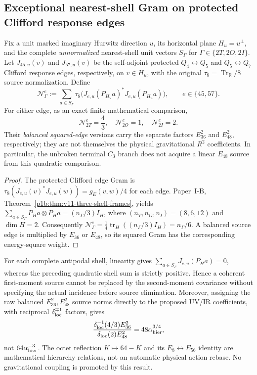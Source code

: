 \documentclass[12pt,a4paper]{article}
\begin{document}
\subsection{Exceptional nearest-shell Gram on protected Clifford response edges}
\label{p3c:sec:et-shell-gram}

\begin{proposition}
\label{p3c:prop:et-shell-edge-gram}
Fix a unit marked imaginary Hurwitz direction $u$, its horizontal plane
$H_u=u^\perp$, and the complete \emph{unnormalized} nearest-shell unit
vectors $S_\Gamma$ for $\Gamma\in\{2T,2O,2I\}$.
Let $J_{45,u}(v)$ and $J_{57,u}(v)$ be the self-adjoint protected
$Q_4\leftrightarrow Q_5$ and $Q_5\leftrightarrow Q_7$ Clifford
response edges, respectively, on $v\in H_u$, with the original
$\tau_8=\operatorname{Tr}_{\mathbb R}/8$ source normalization.  Define
\[
 \mathcal N_\Gamma^e:=\sum_{a\in S_\Gamma}
 \tau_8\bigl(J_{e,u}(P_{H_u}a)^*J_{e,u}(P_{H_u}a)\bigr),
 \qquad e\in\{45,57\}.
\]
For either edge, as an exact finite mathematical comparison,
\[
 \boxed{\mathcal N_{2T}^e=\frac43,\quad
 \mathcal N_{2O}^e=1,\quad \mathcal N_{2I}^e=2.}
\]
Their \emph{balanced squared-edge} versions carry the separate factors
$E_{36}^2$ and $E_{48}^2$, respectively; they are not themselves the
physical gravitational $R^2$ coefficients.  In particular, the
unbroken terminal $C_3$ branch does not acquire a linear $E_{48}$
source from this quadratic comparison.
\end{proposition}
\begin{proof}
The protected Clifford edge Gram is
$\tau_8(J_{e,u}(v)^*J_{e,u}(w))=g_E(v,w)/4$ for each edge.
Paper~I-B, Theorem~\ref{p1b:thm:v11-three-shell-frames}, yields
$\sum_{a\in S_\Gamma}P_Ha\otimes P_Ha=(n_\Gamma/3)I_H$,
where $(n_T,n_O,n_I)=(8,6,12)$ and $\dim H=2$.
Consequently
$\mathcal N_\Gamma^e=\tfrac14\operatorname{tr}_H((n_\Gamma/3)I_H)
=n_\Gamma/6$.
A balanced source edge is multiplied by $E_{36}$ or $E_{48}$,
so its squared Gram has the corresponding energy-square weight.
\end{proof}

\begin{remark}
\label{p3c:rem:et-edge-incidence-firewall}
For each complete antipodal shell, linearity gives
$\sum_{a\in S_\Gamma}J_{e,u}(P_Ha)=0$, whereas the preceding
quadratic shell sum is strictly positive.  Hence a coherent
first-moment source cannot be replaced by the second-moment covariance
without specifying the actual incidence before source elimination.
Moreover, assigning the raw balanced $E_{36}^2,E_{48}^2$ source
norms directly to the proposed UV/IR coefficients, with reciprocal
$\delta_{\rm loc}^{\mp1}$ factors, gives
\[
 \frac{\delta_{\rm loc}^{-1}(4/3)E_{36}^2}
 {\delta_{\rm loc}(2)E_{48}^2}
 =48\alpha_{\rm hier}^{3/4},
\]
not $64\alpha_{\rm hier}^{-3}$.  The octet reflection
$K\mapsto64-K$ and its $E_8\leftrightarrow E_{56}$ identity are
mathematical hierarchy relations, not an automatic physical action
rebase.  No gravitational coupling is promoted by this result.
\end{remark}
\end{document}
